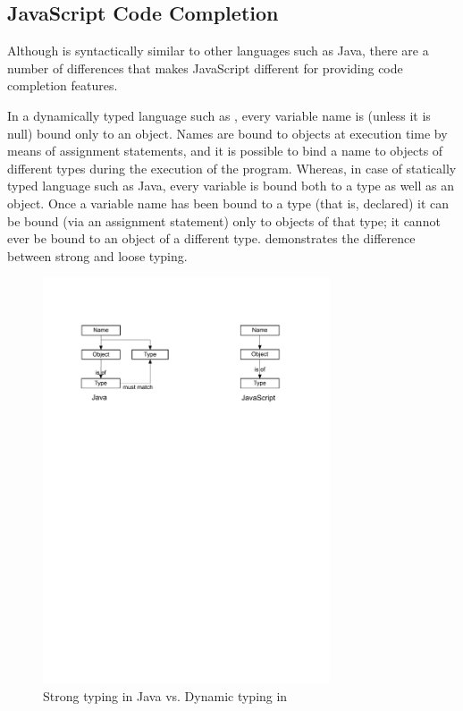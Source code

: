 	\subsection{JavaScript Code Completion}
	\label{Sec:Code-completion}
	
	Although \javascript is syntactically similar to other languages such as Java, there are a number of differences that makes JavaScript different for providing code completion features.
	
	
		In a dynamically typed language such as \javascript, every variable name is (unless it is null) bound only to an object. Names are bound to objects at execution time by means of assignment statements, and it is possible to bind a name to objects of different types during the execution of the program. Whereas, in case of statically typed language such as Java, every variable is bound both to a type as well as an object. Once a variable name has been bound to a type (that is, declared) it can be bound (via an assignment statement) only to objects of that type; it cannot ever be bound to an object of a different type.  demonstrates the difference between strong and loose typing.

		\begin{figure}
			\centering
			\includegraphics[width=85mm]{images/typing.pdf}
			\caption{Strong typing in Java vs. Dynamic typing in \javascript}
			\label{Fig:Typing}
		\end{figure}
		
